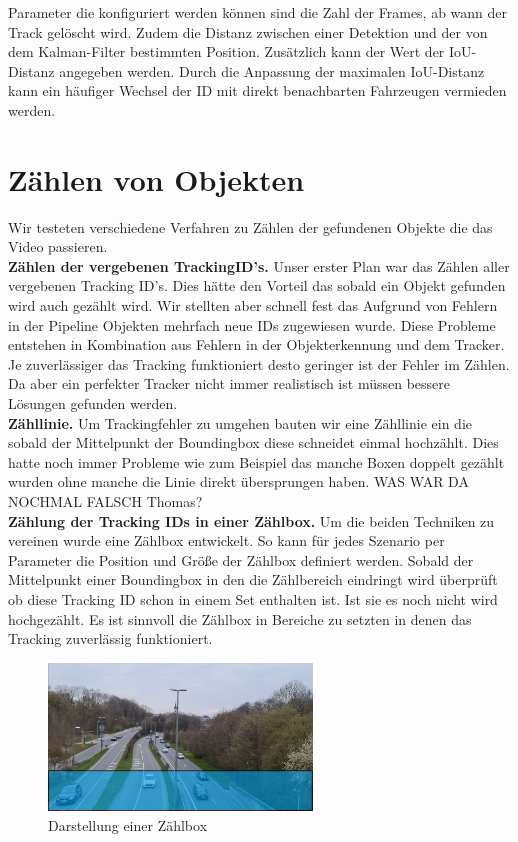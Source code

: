 \documentclass[conference]{IEEEtran}
\begin{document}
	Parameter die konfiguriert werden können sind die Zahl der Frames, ab wann der
	Track gelöscht wird. Zudem die Distanz zwischen einer Detektion und der von dem
	Kalman-Filter bestimmten Position. Zusätzlich kann der Wert der IoU-Distanz angegeben werden.
	Durch die Anpassung der maximalen IoU-Distanz
	kann ein häufiger Wechsel der ID mit direkt benachbarten Fahrzeugen vermieden werden.
	
	
	
	
	
	\section{Zählen von Objekten}
	Wir testeten verschiedene Verfahren zu Zählen der gefundenen Objekte die das Video passieren.\\
	\textbf{Zählen der vergebenen TrackingID's.} Unser erster Plan war das Zählen aller vergebenen Tracking ID's. Dies hätte den Vorteil das sobald ein Objekt gefunden wird auch gezählt wird. Wir stellten aber schnell fest das Aufgrund von Fehlern in der Pipeline Objekten mehrfach neue IDs zugewiesen wurde. Diese Probleme entstehen in Kombination aus Fehlern in der Objekterkennung und dem Tracker. Je zuverlässiger das Tracking funktioniert desto geringer ist der Fehler im Zählen. Da aber ein perfekter Tracker nicht immer realistisch ist müssen bessere Lösungen gefunden werden.\\
	\textbf{Zähllinie.} Um Trackingfehler zu umgehen bauten wir eine Zähllinie ein die sobald der Mittelpunkt der Boundingbox diese schneidet einmal hochzählt. Dies hatte noch immer Probleme wie zum Beispiel das manche Boxen doppelt gezählt wurden ohne manche die Linie direkt übersprungen haben. WAS WAR DA NOCHMAL FALSCH Thomas?\\
	\textbf{Zählung der Tracking IDs in einer Zählbox.} Um die beiden Techniken zu vereinen wurde eine Zählbox entwickelt. So kann für jedes Szenario per Parameter die Position und Größe der Zählbox definiert werden. Sobald der Mittelpunkt einer Boundingbox in den die Zählbereich eindringt wird überprüft ob diese Tracking ID schon in einem Set enthalten ist. Ist sie es noch nicht wird hochgezählt. Es ist sinnvoll die Zählbox in Bereiche zu setzten in denen das Tracking zuverlässig funktioniert. 
	\begin{figure}[!h]
		\begin{center}
			\includegraphics[width=7cm]{Media/BrudermuhlCounter.png}
			\caption{Darstellung einer Zählbox}
			\label{Counter}
		\end{center}
	\end{figure}
	
\end{document}
